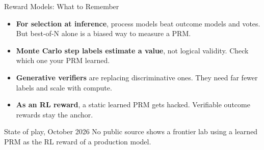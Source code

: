 \begin{frame}{Reward Models: What to Remember}
    \begin{itemize}\itemsep0.4em
        \item \textbf{For selection at inference}, process models beat outcome models and votes. But best-of-N alone is a biased way to measure a PRM.
        \item \textbf{Monte Carlo step labels estimate a value}, not logical validity. Check which one your PRM learned.
        \item \textbf{Generative verifiers} are replacing discriminative ones. They need far fewer labels and scale with compute.
        \item \textbf{As an RL reward}, a static learned PRM gets hacked. Verifiable outcome rewards stay the anchor.
    \end{itemize}
    \vspace{0.1em}
    \begin{block}{State of play, October 2026}
        No public source shows a frontier lab using a learned PRM as the RL reward of a production model.
    \end{block}
    \vspace{0.3em}
\end{frame}
